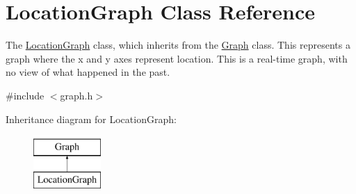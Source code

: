 \hypertarget{class_location_graph}{}\section{Location\+Graph Class Reference}
\label{class_location_graph}


The \hyperlink{class_location_graph}{Location\+Graph} class, which inherits from the \hyperlink{class_graph}{Graph} class. This represents a graph where the x and y axes represent location. This is a real-\/time graph, with no view of what happened in the past.  




{\ttfamily \#include $<$graph.\+h$>$}

Inheritance diagram for Location\+Graph\+:\begin{figure}[H]
\begin{center}
\leavevmode
\includegraphics[height=2.000000cm]{class_location_graph}
\end{center}
\end{figure}
